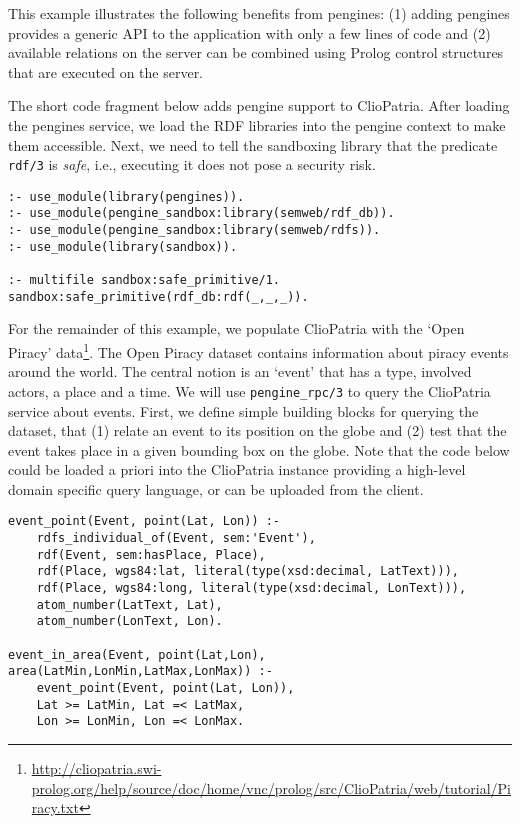 \documentclass{new_tlp}
\newcommand{\reffont}{\tt}
\newcommand{\predref}[2]{\mbox{\reffont #1/#2}}
\begin{document}
This example illustrates the following benefits from pengines: (1)
adding pengines provides a generic API to the application with only a
few lines of code and (2) available relations on the server can be
combined using Prolog control structures that are executed on the
server.

The short code fragment below adds pengine support to ClioPatria. After
loading the pengines service, we load the RDF libraries into the pengine
context to make them accessible. Next, we need to tell the sandboxing
library that the predicate \predref{rdf}{3} is \emph{safe}, i.e.,
executing it does not pose a security risk.

\begin{verbatim}
:- use_module(library(pengines)).
:- use_module(pengine_sandbox:library(semweb/rdf_db)).
:- use_module(pengine_sandbox:library(semweb/rdfs)).
:- use_module(library(sandbox)).

:- multifile sandbox:safe_primitive/1.
sandbox:safe_primitive(rdf_db:rdf(_,_,_)).
\end{verbatim}

For the remainder of this example, we populate ClioPatria with the `Open
Piracy'
data\footnote{\url{http://cliopatria.swi-prolog.org/help/source/doc/home/vnc/prolog/src/ClioPatria/web/tutorial/Piracy.txt}}.
The Open Piracy dataset contains information about piracy events around
the world. The central notion is an `event' that has a type, involved
actors, a place and a time. We will use \predref{pengine\_rpc}{3} to
query the ClioPatria service about events. First, we define simple
building blocks for querying the dataset, that (1) relate an event to
its position on the globe and (2) test that the event takes place in a
given bounding box on the globe. Note that the code below could be
loaded a priori into the ClioPatria instance providing a high-level
domain specific query language, or can be uploaded from the client.

\begin{verbatim}
event_point(Event, point(Lat, Lon)) :-
    rdfs_individual_of(Event, sem:'Event'),
    rdf(Event, sem:hasPlace, Place),
    rdf(Place, wgs84:lat, literal(type(xsd:decimal, LatText))),
    rdf(Place, wgs84:long, literal(type(xsd:decimal, LonText))),
    atom_number(LatText, Lat),
    atom_number(LonText, Lon).

event_in_area(Event, point(Lat,Lon), area(LatMin,LonMin,LatMax,LonMax)) :-
    event_point(Event, point(Lat, Lon)),
    Lat >= LatMin, Lat =< LatMax,
    Lon >= LonMin, Lon =< LonMax.
\end{verbatim}
\end{document}
